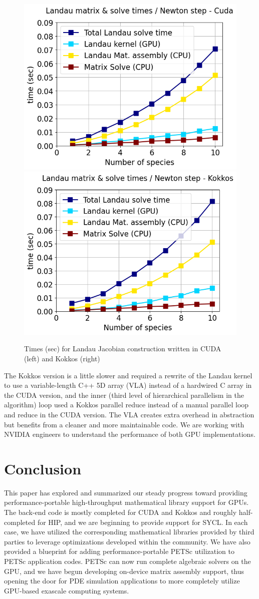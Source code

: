 \documentclass[5p,times]{elsarticle}
\begin{document}
\begin{figure}[ht]
\begin{center}
\includegraphics[width=.48\linewidth]{./landau_time_species_cuda.png}
\includegraphics[width=.48\linewidth]{./landau_time_species_kokkos.png}
\caption{Times (sec) for Landau Jacobian construction written in CUDA (left) and Kokkos (right)}
\label{fig:landau}
\end{center}
\end{figure}
The Kokkos version is a little slower and required a rewrite of the Landau kernel to use a variable-length C++ 5D array (VLA) instead of a hardwired C array in the CUDA version, and the inner (third level of hierarchical parallelism in the algorithm) loop used a Kokkos parallel reduce instead of a manual parallel loop and reduce in the CUDA version.
The VLA creates extra overhead in abstraction but benefits from a cleaner and more maintainable code.
We are  working with NVIDIA engineers to understand the performance of both GPU implementations.


\section{Conclusion}
This paper has explored and summarized our steady progress toward providing
performance-portable high-throughput mathematical library support for GPUs. The back-end code is mostly completed for CUDA and
Kokkos and roughly half-completed for HIP, and we are beginning to provide support for
SYCL. In each case, we have utilized the corresponding mathematical libraries provided by third parties to leverage optimizations developed within the community. We
have also provided a blueprint for adding performance-portable PETSc utilization to
PETSc application codes. PETSc can now run complete algebraic solvers on the GPU, and we have begun developing on-device
matrix assembly support, thus opening the door for PDE simulation applications to more completely utilize GPU-based exascale computing systems.
\end{document}
